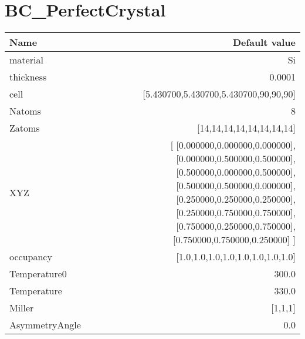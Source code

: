 \documentclass{article}
\begin{document}
\section{BC\_PerfectCrystal}
\begin{tabular}{lr}
Name & Default value \\
\hline
material & Si \\
thickness & 0.0001 \\
cell & [5.430700,5.430700,5.430700,90,90,90] \\
Natoms & 8 \\
Zatoms & [14,14,14,14,14,14,14,14] \\
XYZ & [ [0.000000,0.000000,0.000000],                       [0.000000,0.500000,0.500000],                       [0.500000,0.000000,0.500000],                       [0.500000,0.500000,0.000000],                       [0.250000,0.250000,0.250000],                       [0.250000,0.750000,0.750000],                       [0.750000,0.250000,0.750000],                       [0.750000,0.750000,0.250000] ] \\
occupancy & [1.0,1.0,1.0,1.0,1.0,1.0,1.0,1.0] \\
Temperature0 & 300.0 \\
Temperature & 330.0 \\
Miller & [1,1,1] \\
AsymmetryAngle & 0.0 \\
   
\end{tabular}
\end{document}
